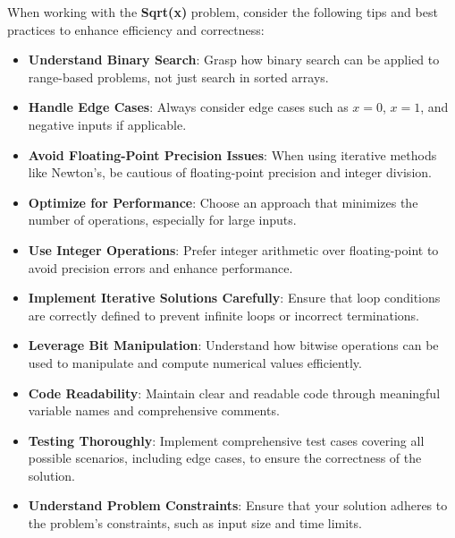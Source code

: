 When working with the \textbf{Sqrt(x)} problem, consider the following tips and best practices to enhance efficiency and correctness:

\begin{itemize}
    \item \textbf{Understand Binary Search}: Grasp how binary search can be applied to range-based problems, not just search in sorted arrays.
    
    \item \textbf{Handle Edge Cases}: Always consider edge cases such as \(x = 0\), \(x = 1\), and negative inputs if applicable.
    
    \item \textbf{Avoid Floating-Point Precision Issues}: When using iterative methods like Newton's, be cautious of floating-point precision and integer division.
    
    \item \textbf{Optimize for Performance}: Choose an approach that minimizes the number of operations, especially for large inputs.
    
    \item \textbf{Use Integer Operations}: Prefer integer arithmetic over floating-point to avoid precision errors and enhance performance.
    
    \item \textbf{Implement Iterative Solutions Carefully}: Ensure that loop conditions are correctly defined to prevent infinite loops or incorrect terminations.
    
    \item \textbf{Leverage Bit Manipulation}: Understand how bitwise operations can be used to manipulate and compute numerical values efficiently.
    
    \item \textbf{Code Readability}: Maintain clear and readable code through meaningful variable names and comprehensive comments.
    
    \item \textbf{Testing Thoroughly}: Implement comprehensive test cases covering all possible scenarios, including edge cases, to ensure the correctness of the solution.
    
    \item \textbf{Understand Problem Constraints}: Ensure that your solution adheres to the problem's constraints, such as input size and time limits.
\end{itemize}


